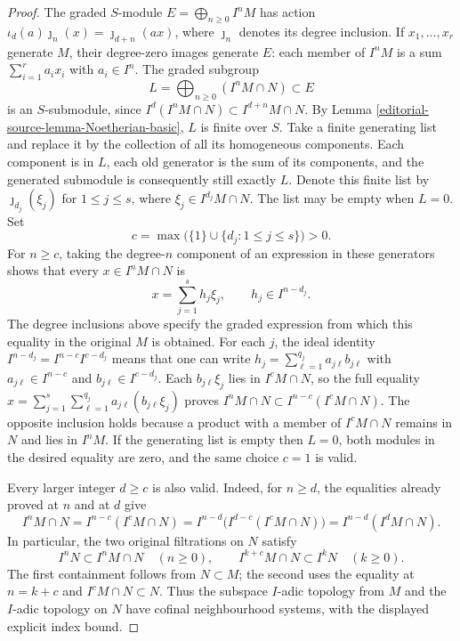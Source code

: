 \begin{proof}
The graded $S$-module
$E=\bigoplus_{n\geq0}I^nM$ has action
$\iota_d(a)\jmath_n(x)=\jmath_{d+n}(ax)$, where $\jmath_n$
denotes its degree inclusion. If $x_1,\ldots,x_r$ generate
$M$, their degree-zero images generate $E$: each member of
$I^nM$ is a sum $\sum_{i=1}^r a_ix_i$ with $a_i\in I^n$.
The graded subgroup
$$
L=\bigoplus_{n\geq0}(I^nM\cap N)\subset E
$$
is an $S$-submodule, since
$I^d(I^nM\cap N)\subset I^{d+n}M\cap N$.
By Lemma \ref{editorial-source-lemma-Noetherian-basic}, $L$ is finite over $S$.
Take a finite generating list and replace it by the collection of
all its homogeneous components. Each component is in $L$, each
old generator is the sum of its components, and the generated
submodule is consequently still exactly $L$. Denote this finite
list by $\jmath_{d_j}(\xi_j)$ for $1\leq j\leq s$, where
$\xi_j\in I^{d_j}M\cap N$. The list may be empty when $L=0$.
Set
$$
c=\max\bigl(\{1\}\cup\{d_j:1\leq j\leq s\}\bigr)>0.
$$
For $n\geq c$, taking the degree-$n$ component of an expression
in these generators shows that every $x\in I^nM\cap N$ is
$$
x=\sum_{j=1}^s h_j\xi_j,\qquad h_j\in I^{n-d_j}.
$$
The degree inclusions above specify the graded expression from
which this equality in the original $M$ is obtained.
For each $j$, the ideal identity
$I^{n-d_j}=I^{n-c}I^{c-d_j}$ means that one can write
$h_j=\sum_{\ell=1}^{q_j}a_{j\ell}b_{j\ell}$ with
$a_{j\ell}\in I^{n-c}$ and $b_{j\ell}\in I^{c-d_j}$.
Each $b_{j\ell}\xi_j$ lies in $I^cM\cap N$, so the full
equality
$x=\sum_{j=1}^s\sum_{\ell=1}^{q_j}
a_{j\ell}(b_{j\ell}\xi_j)$ proves
$I^nM\cap N\subset I^{n-c}(I^cM\cap N)$.
The opposite inclusion holds because a product with a member of
$I^cM\cap N$ remains in $N$ and lies in $I^nM$.
If the generating list is empty then $L=0$, both modules in the
desired equality are zero, and the same choice $c=1$ is valid.

Every larger integer $d\geq c$ is also valid. Indeed, for $n\geq d$,
the equalities already proved at $n$ and at $d$ give
$$
I^nM\cap N=I^{n-c}(I^cM\cap N)
=I^{n-d}\bigl(I^{d-c}(I^cM\cap N)\bigr)
=I^{n-d}(I^dM\cap N).
$$
In particular, the two original filtrations on $N$ satisfy
$$
I^nN\subset I^nM\cap N\quad(n\geq0),\qquad
I^{k+c}M\cap N\subset I^kN\quad(k\geq0).
$$
The first containment follows from $N\subset M$; the second
uses the equality at $n=k+c$ and $I^cM\cap N\subset N$.
Thus the subspace $I$-adic topology from $M$ and the $I$-adic
topology on $N$ have cofinal neighbourhood systems, with the
displayed explicit index bound.
\end{proof}


